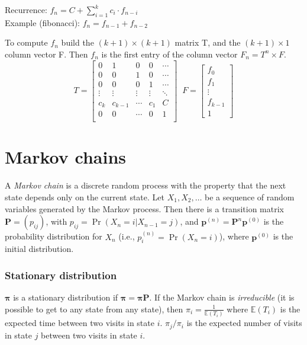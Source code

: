 Recurrence: $f_n = C + \sum_{i=1}^k c_i \cdot f_{n-i}$\\
Example (fibonacci): $f_n = f_{n-1} + f_{n-2}$

To compute $f_n$ build the $(k+1) \times (k+1)$ matrix T, and the $(k+1) \times 1$ column vector F. Then $f_n$ is the first entry of the column vector $F_n = T^n \times F$.
\[ T = \begin{bmatrix}
	0 & 1 & 0 & 0 & \cdots \\
	0 & 0 & 1 & 0 & \cdots \\
	0 & 0 & 0 & 1 & \cdots\\
	\vdots & \vdots & \vdots & \vdots & \ddots \\
	c_k & c_{k-1} & \cdots & c_1 & C \\
	0 & 0 & \cdots & 0 & 1 \\
\end{bmatrix}
\;\;
F = \begin{bmatrix} f_0 \\ f_1 \\ \vdots \\ f_{k-1} \\ 1 \end{bmatrix} \]

\section{Markov chains}
A \emph{Markov chain} is a discrete random process with the property that the next state depends only on the current state.
Let $X_1,X_2,\ldots$ be a sequence of random variables generated by the Markov process.
Then there is a transition matrix $\mathbf{P} = (p_{ij})$, with $p_{ij} = \Pr(X_n = i | X_{n-1} = j)$,
and $\mathbf{p}^{(n)} = \mathbf P^n \mathbf p^{(0)}$ is the probability distribution for $X_n$ (i.e., $p^{(n)}_i = \Pr(X_n = i)$),
where $\mathbf{p}^{(0)}$ is the initial distribution.

\subsubsection{Stationary distribution}
$\mathbf{\pi}$ is a stationary distribution if $\mathbf{\pi} = \mathbf{\pi P}$.
If the Markov chain is \emph{irreducible} (it is possible to get to any state from any state),
then $\pi_i = \frac{1}{\mathbb{E}(T_i)}$ where $\mathbb{E}(T_i)$  is the expected time between two visits in state $i$.
$\pi_j/\pi_i$ is the expected number of visits in state $j$ between two visits in state $i$.

